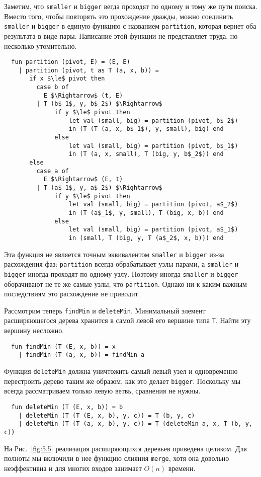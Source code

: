Заметим, что \lstinline!smaller! и \lstinline!bigger! вегда проходят
по одному и тому же пути поиска. Вместо того, чтобы повторять это
прохождение дважды, можно соединить \lstinline!smaller! и
\lstinline!bigger! в единую функцию с названием \lstinline!partition!,
которая вернет оба результата в виде пары.  Написание этой функции не
представляет труда, но несколько утомительно.
\begin{lstlisting}
  fun partition (pivot, E) = (E, E)
    | partition (pivot, t as T (a, x, b)) =
       if x $\le$ pivot then
         case b of
           E $\Rightarrow$ (t, E)
         | T (b$_1$, y, b$_2$) $\Rightarrow$
              if y $\le$ pivot then
                  let val (small, big) = partition (pivot, b$_2$)
                  in (T (T (a, x, b$_1$), y, small), big) end
              else
                  let val (small, big) = partition (pivot, b$_1$)
                  in (T (a, x, small), T (big, y, b$_2$)) end
       else
         case a of
           E $\Rightarrow$ (E, t)
         | T (a$_1$, y, a$_2$) $\Rightarrow$
              if y $\le$ pivot then
                  let val (small, big) = partition (pivot, a$_2$)
                  in (T (a$_1$, y, small), T (big, x, b)) end
              else
                  let val (small, big) = partition (pivot, a$_1$)
                  in (small, T (big, y, T (a$_2$, x, b))) end
\end{lstlisting}

\begin{remark}
  Эта функция не является точным эквивалентом \lstinline!smaller! и
  \lstinline!bigger! из-за расхождения фаз: \lstinline!partition!
  всегда обрабатывает узлы парами, а \lstinline!smaller! и
  \lstinline!bigger! иногда проходят по одному узлу.  Поэтому иногда
  \lstinline!smaller! и \lstinline!bigger! оборачивают не те же самые
  узлы, что \lstinline!partition!. Однако ни к каким важным
  последствиям это расхождение не приводит.
\end{remark}

Рассмотрим теперь \lstinline!findMin! и
\lstinline!deleteMin!. Минимальный элемент расширяющегося дерева
хранится в самой левой его вершине типа \lstinline!T!. Найти эту
вершину несложно.
\begin{lstlisting}
  fun findMin (T (E, x, b)) = x
    | findMin (T (a, x, b)) = findMin a
\end{lstlisting}
Функция \lstinline!deleteMin! должна уничтожить самый левый узел и
одновременно перестроить дерево таким же образом, как это делает
\lstinline!bigger!. Поскольку мы всегда рассматриваем только левую
ветвь, сравнения не нужны.
\begin{lstlisting}
  fun deleteMin (T (E, x, b)) = b
    | deleteMin (T (T (E, x, b), y, c)) = T (b, y, c)
    | deleteMin (T (T (a, x, b), y, c)) = T (deleteMin a, x, T (b, y, c))
\end{lstlisting}
На Рис.~\ref{fig:5.5} реализация расширяющихся
деревьев приведена целиком. Для полноты мы включили в нее функцию слияния
\lstinline!merge!, хотя она довольно неэффективна и для многих входов
занимает $O(n)$ времени.

